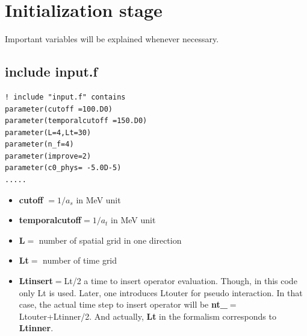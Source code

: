 \documentclass[10pt]{book}
\begin{document}
\section{Initialization stage}
Important variables will be explained whenever necessary. 
\subsection{include input.f}
\begin{lstlisting}[frame=single]
! include "input.f" contains 
parameter(cutoff =100.D0)
parameter(temporalcutoff =150.D0)
parameter(L=4,Lt=30)
parameter(n_f=4)
parameter(improve=2)
parameter(c0_phys= -5.0D-5)
.....
\end{lstlisting} 
\begin{itemize}
	\item {\bf cutoff} $=1/a_s$ in MeV unit
	\item {\bf temporalcutoff}$=1/a_t$ in MeV unit
	\item {\bf L}$=$ number of spatial grid in one direction
	\item {\bf Lt}$=$ number of time grid
	\item {\bf Ltinsert}$=$Lt/2 a time to insert operator evaluation. 
	      Though, in this code only Lt is used. Later, one introduces
	      Ltouter for pseudo interaction. 
	      In that case, the actual time step to insert operator will be 
	      {\bf nt\_}$=$Ltouter+Ltinner/2. 
	      And actually, {\bf Lt} in the formalism corresponds to {\bf Ltinner}. 
	      

\end{itemize}
\end{document}
